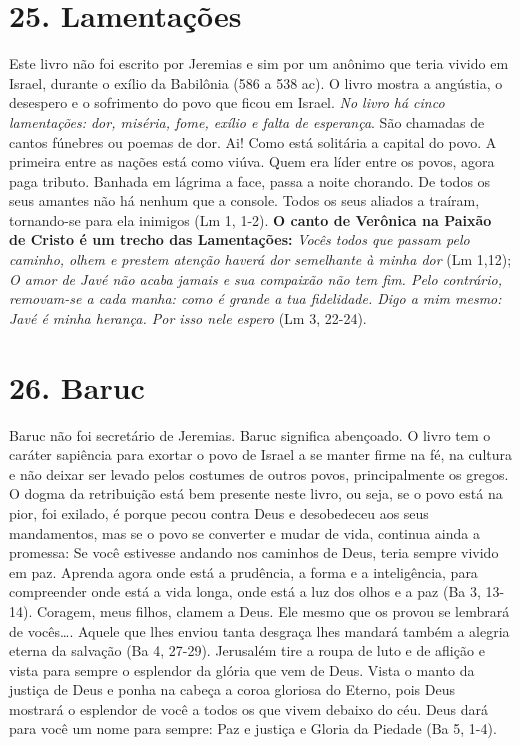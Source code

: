 \documentclass[
]{book}
\begin{document}
\hypertarget{lamentauxe7uxf5es}{%
\section*{25. Lamentações}\label{lamentauxe7uxf5es}}

Este livro não foi escrito por Jeremias e sim por um anônimo que teria vivido em Israel, durante o exílio da Babilônia (586 a 538 ac). O livro mostra a angústia, o desespero e o sofrimento do povo que ficou em Israel. \emph{No livro há cinco lamentações: dor, miséria, fome, exílio e falta de esperança}. São chamadas de cantos fúnebres ou poemas de dor. Ai! Como está solitária a capital do povo. A primeira entre as nações está como viúva. Quem era líder entre os povos, agora paga tributo. Banhada em lágrima a face, passa a noite chorando. De todos os seus amantes não há nenhum que a console. Todos os seus aliados a traíram, tornando-se para ela inimigos (Lm 1, 1-2). \textbf{O canto de Verônica na Paixão de Cristo é um trecho das Lamentações:} \emph{Vocês todos que passam pelo caminho, olhem e prestem atenção haverá dor semelhante à minha dor} (Lm 1,12); \emph{O amor de Javé não acaba jamais e sua compaixão não tem fim. Pelo contrário, removam-se a cada manha: como é grande a tua fidelidade. Digo a mim mesmo: Javé é minha herança. Por isso nele espero} (Lm 3, 22-24).

\hypertarget{baruc}{%
\section*{26. Baruc}\label{baruc}}

Baruc não foi secretário de Jeremias. Baruc significa abençoado. O livro tem o caráter sapiência para exortar o povo de Israel a se manter firme na fé, na cultura e não deixar ser levado pelos costumes de outros povos, principalmente os gregos. O dogma da retribuição está bem presente neste livro, ou seja, se o povo está na pior, foi exilado, é porque pecou contra Deus e desobedeceu aos seus mandamentos, mas se o povo se converter e mudar de vida, continua ainda a promessa: Se você estivesse andando nos caminhos de Deus, teria sempre vivido em paz. Aprenda agora onde está a prudência, a forma e a inteligência, para compreender onde está a vida longa, onde está a luz dos olhos e a paz (Ba 3, 13-14). Coragem, meus filhos, clamem a Deus. Ele mesmo que os provou se lembrará de vocês\ldots. Aquele que lhes enviou tanta desgraça lhes mandará também a alegria eterna da salvação (Ba 4, 27-29). Jerusalém tire a roupa de luto e de aflição e vista para sempre o esplendor da glória que vem de Deus. Vista o manto da justiça de Deus e ponha na cabeça a coroa gloriosa do Eterno, pois Deus mostrará o esplendor de você a todos os que vivem debaixo do céu. Deus dará para você um nome para sempre: Paz e justiça e Gloria da Piedade (Ba 5, 1-4).
\end{document}
